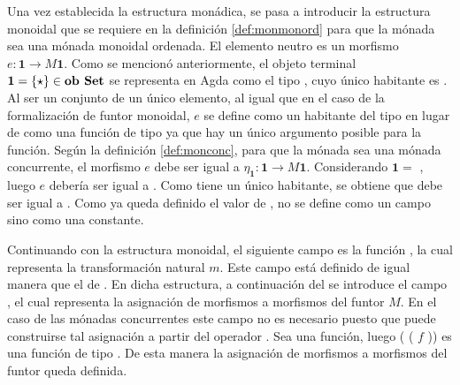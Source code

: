 Una vez establecida la estructura monádica, se pasa a introducir la estructura monoidal que se requiere en la definición \ref{def:monmonord} para que la mónada sea una mónada monoidal ordenada. El elemento neutro es un morfismo $e : \mathbf{1} \rightarrow \mathit{M} \mathbf{1}$. Como se mencionó anteriormente, el objeto terminal $\mathbf{1} = \{\star\} \in \text{\bf ob Set}$ se representa en Agda como el tipo \AgdaDatatype{$\top$}, cuyo único habitante es . Al ser un conjunto de un único elemento, al igual que en el caso de la formalización de funtor monoidal, $e$ se define como un habitante  del tipo  \AgdaDatatype{$\top$} en lugar de como una función de tipo \AgdaDatatype{$\top$} \AgdaSymbol{$\rightarrow$}  \AgdaDatatype{$\top$} ya que hay un único argumento posible para la función. Según la definición \ref{def:monconc}, para que la mónada sea una mónada concurrente, el morfismo $e$ debe ser igual a $\eta_{\mathbf{1}} : \mathbf{1} \rightarrow \mathit{M} \mathbf{1}$. Considerando $\mathbf{1} =$ \AgdaDatatype{$\top$}, luego $e$ debería ser igual a  \AgdaSymbol{\{}\AgdaDatatype{$\top$}\AgdaSymbol{\} :} \AgdaDatatype{$\top$} \AgdaSymbol{$\rightarrow$}  \AgdaDatatype{$\top$}. Como \AgdaDatatype{$\top$} tiene un único habitante, se obtiene que  debe ser igual a   \AgdaSymbol{:}  \AgdaDatatype{$\top$}. Como ya queda definido el valor de , no se define como un campo sino como una constante.

Continuando con la estructura monoidal, el siguiente campo es la función , la cual representa la transformación natural $m$. Este campo está definido de igual manera que el  de . En dicha estructura, a continuación del  se introduce el campo , el cual representa la asignación de morfismos a morfismos del funtor $\mathit{M}$. En el caso de las mónadas concurrentes este campo no es necesario puesto que puede construirse tal asignación a partir del operador \AgdaField{$\gg=$}. Sea  \AgdaSymbol{:}  \AgdaSymbol{$\rightarrow$}   una función, luego (\AgdaSymbol{$\lambda$}  \AgdaSymbol{$\rightarrow$}  \AgdaField{$\gg=$} (\AgdaSymbol{$\lambda$}  \AgdaSymbol{$\rightarrow$}  $f$ )) es una función de tipo  \AgdaSymbol{$\rightarrow$} . De esta manera la asignación de morfismos a morfismos del funtor queda definida. 

